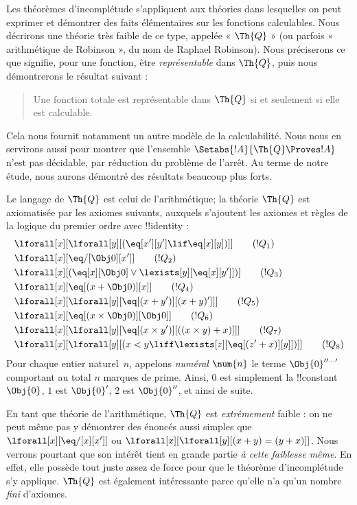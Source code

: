 \documentclass[../../../include/open-logic-section]{subfiles}
\begin{document}

Les théorèmes d'incomplétude s'appliquent aux théories dans
lesquelles on peut exprimer et démontrer des faits élémentaires sur
les fonctions calculables. Nous décrirons une théorie très faible
de ce type, appelée « $\Th{Q}$ » (ou parfois « arithmétique de Robinson »,
du nom de Raphael Robinson). Nous préciserons ce que signifie,
pour une fonction, être \emph{représentable} dans $\Th{Q}$, puis
nous démontrerons le résultat suivant :
\begin{quote}
  Une fonction totale est représentable dans $\Th{Q}$ si et seulement si
  elle est calculable.
\end{quote}
Cela nous fournit notamment un autre modèle de la calculabilité.
Nous nous en servirons aussi pour montrer que l'ensemble
$\Setabs{!A}{\Th{Q} \Proves !A}$ n'est pas décidable, par réduction
du problème de l'arrêt. Au terme de notre étude, nous aurons
démontré des résultats beaucoup plus forts.

Le langage de $\Th{Q}$ est celui de l'arithmétique; la théorie
$\Th{Q}$ est axiomatisée par les axiomes suivants, auxquels s'ajoutent
les axiomes et règles de la logique du premier ordre avec
!!{identity} :
\begin{align*}
& \lforall[x][\lforall[y][(\eq[x'][y'] \lif \eq[x][y])]] \tag{$!Q_1$}\\
& \lforall[x][\eq/[\Obj 0][x']] \tag{$!Q_2$}\\
& \lforall[x][(\eq[x][\Obj 0] \lor \lexists[y][\eq[x][y']])] \tag{$!Q_3$}\\
& \lforall[x][\eq[(x + \Obj 0)][x]] \tag{$!Q_4$}\\
& \lforall[x][\lforall[y][\eq[(x + y')][(x + y)']]] \tag{$!Q_5$}\\
& \lforall[x][\eq[(x \times \Obj 0)][\Obj 0]] \tag{$!Q_6$}\\
& \lforall[x][\lforall[y][\eq[(x \times y')][((x \times y) + x)]]] \tag{$!Q_7$}\\
& \lforall[x][\lforall[y][(x < y \liff \lexists[z][\eq[(z' + x)][y]])]] \tag{$!Q_8$}
\end{align*}
Pour chaque entier naturel~$n$, appelons \emph{numéral}
$\num{n}$ le terme $\Obj{0}^{\prime\prime\ldots\prime}$ comportant
au total $n$ marques de prime. Ainsi, $\num{0}$ est simplement
la !!{constant}~$\Obj{0}$, $\num{1}$ est $\Obj{0}'$,
$\num{2}$ est $\Obj{0}''$, et ainsi de suite.

En tant que théorie de l'arithmétique, $\Th{Q}$ est
\emph{extrêmement} faible : on ne peut même pas y démontrer des
énoncés aussi simples que $\lforall[x][\eq/[x][x']]$ ou
$\lforall[x][\lforall[y][(x + y) = (y + x)]]$. Nous verrons
pourtant que son intérêt tient en grande partie \emph{à cette
faiblesse même}. En effet, elle possède tout juste assez de force
pour que le théorème d'incomplétude s'y applique. $\Th{Q}$ est
également intéressante parce qu'elle n'a qu'un nombre
\emph{fini} d'axiomes.
\end{document}
